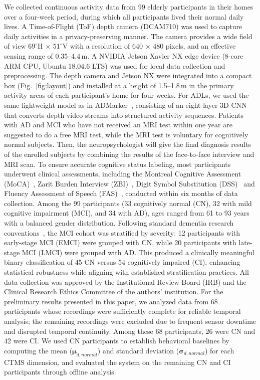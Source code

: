 \documentclass[sigconf, anonymous, 9pt, nonacm]{acmart}
\begin{document}
We collected continuous activity data from 99 elderly participants in their homes over a four-week period, during which all participants lived their normal daily lives. A Time-of-Flight (ToF) depth camera (DCAM710) was used to capture daily activities in a privacy-preserving manner. The camera provides a wide field of view $69^{\circ}$H $\times$ $51^{\circ}$V with a resolution of 640 $\times$ 480 pixels, and an effective sensing range of 0.35–4.4\,m. A NVIDIA Jetson Xavier NX edge device (8-core ARM CPU, Ubuntu 18.04.6 LTS) was used for local data collection and preprocessing. The depth camera and Jetson NX were integrated into a compact box (Fig.~\ref{fig:layout}) and installed at a height of 1.5–1.8\,m in the primary activity areas of each participant's home for four weeks.
For ADLs, we used the same lightweight model as in ADMarker~\cite{ouyang2024ADMarker}, consisting of an eight-layer 3D-CNN that converts depth video streams into structured activity sequences. Patients with AD and MCI who have not received
an MRI test within one year are suggested to do a free MRI
test, while the MRI test is voluntary for cognitively normal
subjects. Then, the neuropsychologist will give the final diagnosis results of the enrolled subjects by combining the
results of the face-to-face interview and MRI scan.
To ensure accurate cognitive status labeling, most participants underwent clinical assessments, including the Montreal Cognitive Assessment (MoCA)~\cite{Nasreddine2005MoCA}, Zarit Burden Interview (ZBI)~\cite{Zarit1980ZBI}, Digit Symbol Substitution (DSS)~\cite{Loreck1994DSS} and Fluency Assessment of Speech (FAS)~\cite{FAS}, conducted within six months of data collection.
Among the 99 participants (33 cognitively normal (CN), 32 with mild cognitive impairment (MCI), and 34 with AD), ages ranged from 61 to 93 years with a balanced gender distribution. Following standard dementia research conventions~\cite{Petersen2001MCI, Aisen2010ADNI}, the MCI cohort was stratified by severity: 12 participants with early-stage MCI (EMCI) were grouped with CN, while 20 participants with late-stage MCI (LMCI) were grouped with AD. This produced a clinically meaningful binary classification of 45 CN versus 54 cognitively impaired (CI), enhancing statistical robustness while aligning with established stratification practices.
All data collection was approved by the Institutional Review Board (IRB) and the Clinical Research Ethics Committee of the authors' institution. For the preliminary results presented in this paper, we analyzed data from 68 participants whose recordings were sufficiently complete for reliable temporal analysis; the remaining recordings were excluded due to frequent sensor downtime and disrupted temporal continuity. Among these 68 participants, 26 were CN and 42 were CI. We used CN participants to establish behavioral baselines by computing the mean ($\boldsymbol{\mu}_{d,normal}$) and standard deviation ($\boldsymbol{\sigma}_{d,normal}$) for each CTMS dimension, and evaluated the system on the remaining CN and CI participants through offline analysis.
\end{document}
